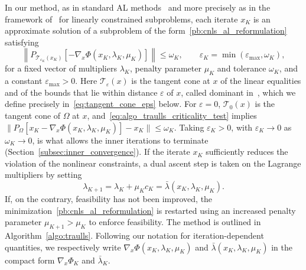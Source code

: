 \documentclass[pdflatex,sn-mathphys-num]{sn-jnl}%
\theoremstyle{thmstyleone}%
\newcommand{\calT}{{\mathcal{T}}}
\newcommand{\proj}[2]{P_{#1} \left[ {#2} \right]} %
\begin{document}
In our method, as in standard AL methods~\cite{conn-etal:1991,conn-etal:2000} and more precisely as in the framework of~\cite{conn-etal:1996b} for linearly constrained subproblems, each iterate $x_K$ is an approximate solution of a subproblem of the form~\eqref{pb:cnls_al_reformulation} satisfying
\begin{equation}\label{eq:algo_traulls_criticality_test}
	\left\|\proj{\calT_{\varepsilon_K}(x_K)}{-\nabla_x\Phi(x_K, \lambda_K, \mu_K)}\right\| \le \omega_K, \qquad \varepsilon_K = \min(\varepsilon_{\max},\omega_K),
\end{equation}
for a fixed vector of multipliers $\lambda_K$, penalty parameter $\mu_K$ and tolerance $\omega_K$, and a constant $\varepsilon_{\max} > 0$. Here $\calT_\varepsilon(x)$ is the tangent cone at $x$ of the linear equalities and of the bounds that lie within distance $\varepsilon$ of $x$, called dominant in~\cite{conn-etal:1996b}, which we define precisely in~\eqref{eq:tangent_cone_eps} below. For $\varepsilon = 0$, $\calT_0(x)$ is the tangent cone of $\Omega$ at $x$, and~\eqref{eq:algo_traulls_criticality_test} implies $\|\proj{\Omega}{x_K-\nabla_x\Phi(x_K, \lambda_K, \mu_K)}-x_K\| \le \omega_K$. Taking $\varepsilon_K > 0$, with $\varepsilon_K \to 0$ as $\omega_K \to 0$, is what allows the inner iterations to terminate (Section~\ref{subsec:inner_convergence}).
If the iterate $x_K$ sufficiently reduces the violation of the nonlinear constraints, a dual ascent step is taken on the Lagrange multipliers by setting
\begin{equation*}
	\lambda_{K+1} = \lambda_K + \mu_K c_K = \bar{\lambda}(x_K,\lambda_K,\mu_K).
\end{equation*}
If, on the contrary, feasibility has not been improved, the minimization~\eqref{pb:cnls_al_reformulation} is restarted using an increased penalty parameter $\mu_{K+1} > \mu_K$ to enforce feasibility. The method is outlined in Algorithm~\ref{algo:traulls}. Following our notation for iteration-dependent quantities, we respectively write $\nabla_x\Phi(x_K, \lambda_K, \mu_K)$ and $\bar{\lambda}(x_K,\lambda_K,\mu_K)$ in the compact form $\nabla_x \Phi_K$ and $\bar{\lambda}_K$.
\end{document}
